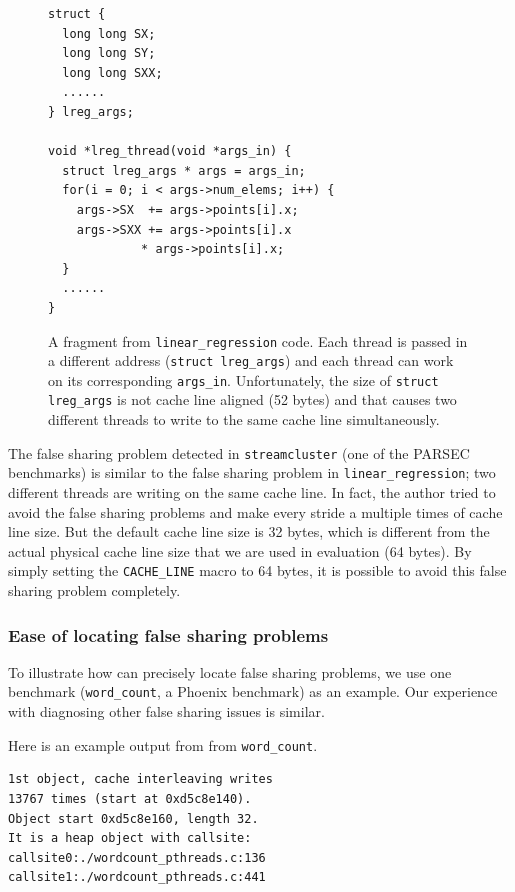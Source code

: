 \begin{figure}[!t]
\begin{lstlisting}
struct {
  long long SX;
  long long SY;
  long long SXX;
  ......
} lreg_args;

void *lreg_thread(void *args_in) {
  struct lreg_args * args = args_in;
  for(i = 0; i < args->num_elems; i++) {
    args->SX  += args->points[i].x;
    args->SXX += args->points[i].x 
   	         * args->points[i].x;
  }
  ......	
}
\end{lstlisting}
\caption{A fragment from \texttt{linear\_regression} code. 
Each thread is passed in a different address (\texttt{struct lreg\_args}) and each thread can work on its corresponding \texttt{args\_in}. 
Unfortunately, the size of \texttt{struct lreg\_args} is not cache line aligned (52 bytes) and that
causes two different threads to write to the same cache line simultaneously. 
\label{fig:linear_regression}}
\end{figure}

The false sharing problem detected in \texttt{streamcluster} (one of the PARSEC benchmarks) is similar to the false sharing problem in \texttt{linear\_regression}; two different threads are writing on the same cache line.  In fact, the author tried to avoid the false sharing problems and make every stride a multiple times of cache line size. But the default cache line size is 32 bytes, which is different from the actual physical cache line size that we are used in evaluation (64 bytes).  By simply setting the \texttt{CACHE\_LINE} macro to 64 bytes, it is possible to avoid this false sharing problem completely.


\subsubsection{Ease of locating false sharing problems}

To illustrate how \sheriffdetect{} can precisely locate false sharing problems, we use one benchmark (\texttt{word\_count}, a Phoenix benchmark) as an example. Our experience with diagnosing other false sharing issues is similar.

Here is an example output from \sheriffdetect{} from \texttt{word\_count}.

\begin{verbatim} 
1st object, cache interleaving writes 
13767 times (start at 0xd5c8e140). 
Object start 0xd5c8e160, length 32. 
It is a heap object with callsite:
callsite0:./wordcount_pthreads.c:136
callsite1:./wordcount_pthreads.c:441
\end{verbatim}

